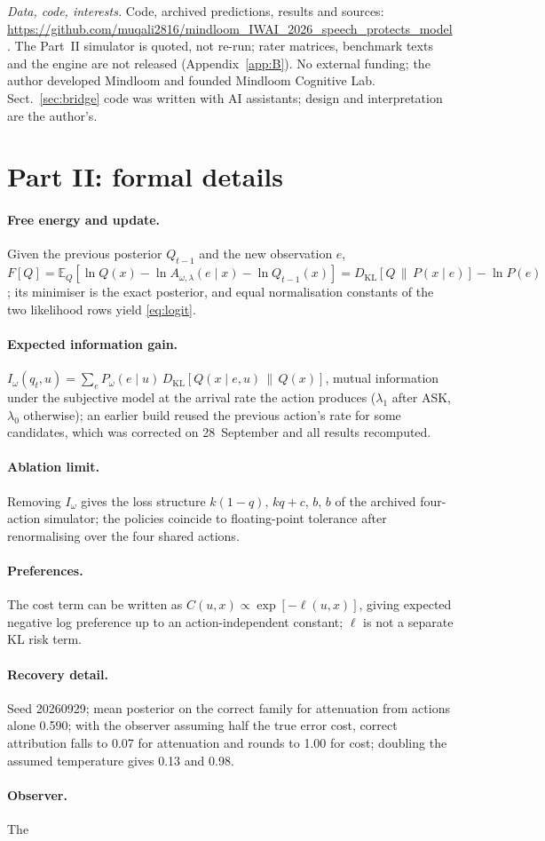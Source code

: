\documentclass[runningheads]{llncs}
\newcommand{\Iw}{I_{\omega}}
\begin{document}
\noindent\textit{Data, code, interests.} Code, archived predictions, results and sources: \url{https://github.com/muqali2816/mindloom_IWAI_2026_speech_protects_model}. The Part~II simulator is quoted, not re-run; rater matrices, benchmark texts and the engine are not released (Appendix~\ref{app:B}). No external funding; the author developed Mindloom and founded Mindloom Cognitive Lab. Sect.~\ref{sec:bridge} code was written with AI assistants; design and interpretation are the author's.




\appendix
\section{Part II: formal details}
\label{app:A}
\paragraph{Free energy and update.} Given the previous posterior $Q_{t-1}$ and the new observation $e$, $F[Q]=\mathbb{E}_Q[\ln Q(x)-\ln A_{\omega,\lambda}(e\mid x)-\ln Q_{t-1}(x)]=D_{\mathrm{KL}}[Q\,\|\,P(x\mid e)]-\ln P(e)$; its minimiser is the exact posterior, and equal normalisation constants of the two likelihood rows yield \eqref{eq:logit}. \paragraph{Expected information gain.} $\Iw(q_t,u)=\sum_e P_\omega(e\mid u)\,D_{\mathrm{KL}}[Q(x\mid e,u)\,\|\,Q(x)]$, mutual information under the subjective model at the arrival rate the action produces ($\lambda_1$ after ASK, $\lambda_0$ otherwise); an earlier build reused the previous action's rate for some candidates, which was corrected on 28~September and all results recomputed. \paragraph{Ablation limit.} Removing $\Iw$ gives the loss structure $k(1-q),\,kq+c,\,b,\,b$ of the archived four-action simulator; the policies coincide to floating-point tolerance after renormalising over the four shared actions. \paragraph{Preferences.} The cost term can be written as $C(u,x)\propto\exp[-\ell(u,x)]$, giving expected negative log preference up to an action-independent constant; $\ell$ is not a separate KL risk term. \paragraph{Recovery detail.} Seed 20260929; mean posterior on the correct family for attenuation from actions alone 0.590; with the observer assuming half the true error cost, correct attribution falls to 0.07 for attenuation and rounds to 1.00 for cost; doubling the assumed temperature gives 0.13 and 0.98. \paragraph{Observer.} The 
\end{document}

